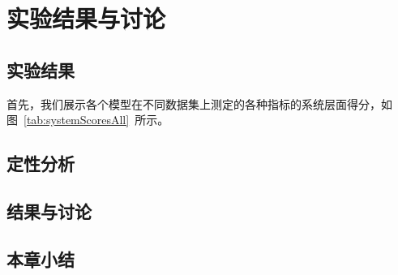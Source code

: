 
\chapter{实验结果与讨论}\label{ch:experiment}

\section{实验结果}\label{sec:experiment_result}
首先，我们展示各个模型在不同数据集上测定的各种指标的系统层面得分，如图~\ref{tab:systemScoresAll}~所示。


\section{定性分析}\label{sec:qualitative_analysis}

\section{结果与讨论}\label{sec:result_and_discussion}

\section{本章小结}\label{sec:experiment_conclusion}
